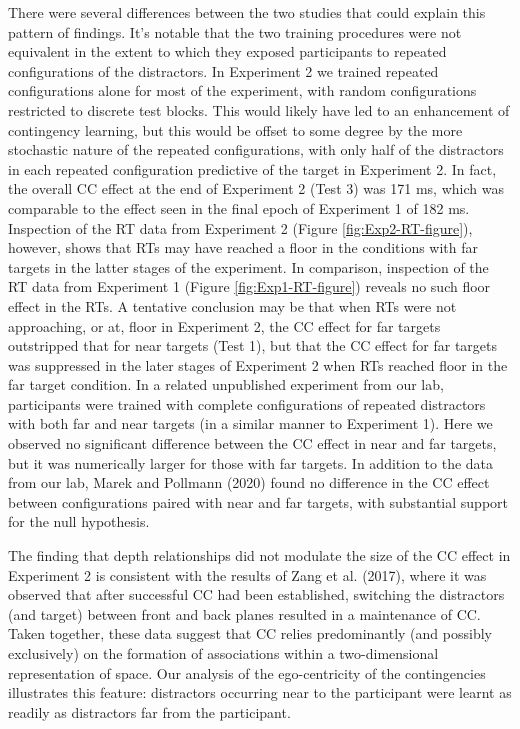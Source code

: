 \documentclass[
  english,
  man,floatsintext]{apa7}
\begin{document}
There were several differences between the two studies that could explain this pattern of findings. It's notable that the two training procedures were not equivalent in the extent to which they exposed participants to repeated configurations of the distractors. In Experiment 2 we trained repeated configurations alone for most of the experiment, with random configurations restricted to discrete test blocks. This would likely have led to an enhancement of contingency learning, but this would be offset to some degree by the more stochastic nature of the repeated configurations, with only half of the distractors in each repeated configuration predictive of the target in Experiment 2. In fact, the overall CC effect at the end of Experiment 2 (Test 3) was 171 ms, which was comparable to the effect seen in the final epoch of Experiment 1 of 182 ms. Inspection of the RT data from Experiment 2 (Figure \ref{fig:Exp2-RT-figure}), however, shows that RTs may have reached a floor in the conditions with far targets in the latter stages of the experiment. In comparison, inspection of the RT data from Experiment 1 (Figure \ref{fig:Exp1-RT-figure}) reveals no such floor effect in the RTs. A tentative conclusion may be that when RTs were not approaching, or at, floor in Experiment 2, the CC effect for far targets outstripped that for near targets (Test 1), but that the CC effect for far targets was suppressed in the later stages of Experiment 2 when RTs reached floor in the far target condition. In a related unpublished experiment from our lab, participants were trained with complete configurations of repeated distractors with both far and near targets (in a similar manner to Experiment 1). Here we observed no significant difference between the CC effect in near and far targets, but it was numerically larger for those with far targets. In addition to the data from our lab, Marek and Pollmann (2020) found no difference in the CC effect between configurations paired with near and far targets, with substantial support for the null hypothesis.

The finding that depth relationships did not modulate the size of the CC effect in Experiment 2 is consistent with the results of Zang et al. (2017), where it was observed that after successful CC had been established, switching the distractors (and target) between front and back planes resulted in a maintenance of CC. Taken together, these data suggest that CC relies predominantly (and possibly exclusively) on the formation of associations within a two-dimensional representation of space. Our analysis of the ego-centricity of the contingencies illustrates this feature: distractors occurring near to the participant were learnt as readily as distractors far from the participant.
\end{document}
